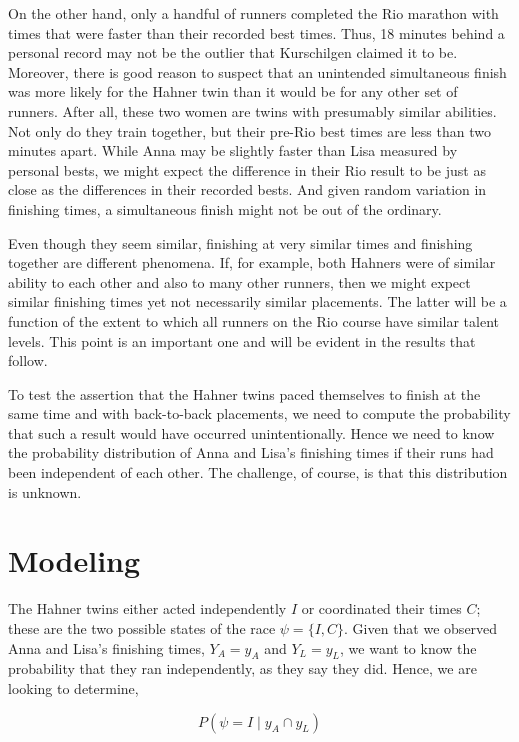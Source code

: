 \documentclass[12pt,titlepage]{article}
\begin{document}
On the other hand, only a handful of runners completed the Rio
marathon with times that were faster than their recorded best times.
Thus, 18 minutes behind a personal record may not be the outlier that
Kurschilgen claimed it to be. Moreover, there is good reason to
suspect that an unintended simultaneous finish was more likely for the
Hahner twin than it would be for any other set of runners. After all,
these two women are twins with presumably similar abilities. Not only
do they train together, but their pre-Rio best times are less than two
minutes apart. While Anna may be slightly faster than Lisa measured by
personal bests, we might expect the difference in their Rio result to
be just as close as the differences in their recorded bests. And given
random variation in finishing times, a simultaneous finish might not
be out of the ordinary.

Even though they seem similar, finishing at very similar times and
finishing together are different phenomena. If, for example, both
Hahners were of similar ability to each other and also to many other
runners, then we might expect similar finishing times yet not
necessarily similar placements. The latter will be a function of the
extent to which all runners on the Rio course have similar talent
levels.  This point is an important one and will be evident in the
results that follow.

To test the assertion that the Hahner twins paced themselves to finish
at the same time and with back-to-back placements, we need to compute
the probability that such a result would have occurred
unintentionally. Hence we need to know the probability distribution of
Anna and Lisa's finishing times if their runs had been independent of
each other. The challenge, of course, is that this distribution is
unknown.  

\section*{Modeling}


The Hahner twins either acted independently $I$ or coordinated their
times $C$; these are the two possible states of the race
$\psi = \{I, C\}$. Given that we observed Anna and Lisa's finishing
times, $Y_A = y_A$ and $Y_L = y_L$, we want to know the probability
that they ran independently, as they say they did. Hence, we are
looking to determine, 

$$P(\psi = I \mid y_A  \cap y_L )$$
\end{document}
